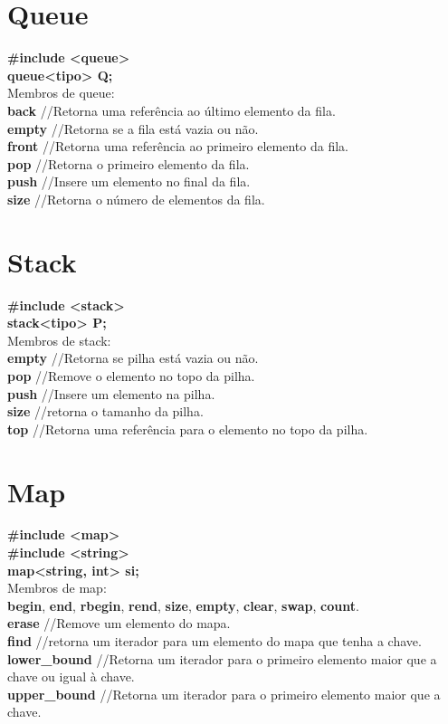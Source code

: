 \begin{multicols}{2}
\section{Queue}

\textbf{\#include <queue>}\\
\textbf{queue<tipo> Q;}\\

Membros de queue:\\
\textbf{back} //Retorna uma referência ao último elemento da fila.\\
\textbf{empty} //Retorna se a fila está vazia ou não.\\
\textbf{front} //Retorna uma referência ao primeiro elemento da fila.\\
\textbf{pop} //Retorna o primeiro elemento da fila.\\
\textbf{push} //Insere um elemento no final da fila.\\
\textbf{size} //Retorna o número de elementos da fila.

\section{Stack}

\textbf{\#include <stack>}\\
\textbf{stack<tipo> P;}\\

Membros de stack:\\
\textbf{empty} //Retorna se pilha está vazia ou não.\\
\textbf{pop} //Remove o elemento no topo da pilha.\\
\textbf{push} //Insere um elemento na pilha.\\
\textbf{size} //retorna o tamanho da pilha.\\
\textbf{top} //Retorna uma referência para o elemento no topo da pilha.

\section{Map}

\textbf{\#include <map>}\\
\textbf{\#include <string>}\\
\textbf{map<string, int> si;}\\

Membros de map:\\
\textbf{begin}, \textbf{end}, \textbf{rbegin}, \textbf{rend}, \textbf{size}, \textbf{empty}, \textbf{clear}, \textbf{swap}, \textbf{count}.\\
\textbf{erase} //Remove um elemento do mapa.\\
\textbf{find} //retorna um iterador para um elemento do mapa que tenha a chave.\\
\textbf{lower\_bound} //Retorna um iterador para o primeiro elemento maior que a chave ou igual à chave.\\
\textbf{upper\_bound} //Retorna um iterador para o primeiro elemento maior que a chave.\\


\end{multicols}
